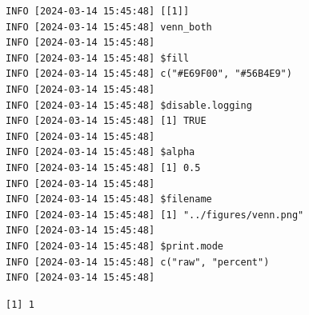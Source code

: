 \documentclass[
  letterpaper,
  DIV=11,
  numbers=noendperiod]{scrartcl}
\begin{document}
\begin{verbatim}
INFO [2024-03-14 15:45:48] [[1]]
INFO [2024-03-14 15:45:48] venn_both
INFO [2024-03-14 15:45:48] 
INFO [2024-03-14 15:45:48] $fill
INFO [2024-03-14 15:45:48] c("#E69F00", "#56B4E9")
INFO [2024-03-14 15:45:48] 
INFO [2024-03-14 15:45:48] $disable.logging
INFO [2024-03-14 15:45:48] [1] TRUE
INFO [2024-03-14 15:45:48] 
INFO [2024-03-14 15:45:48] $alpha
INFO [2024-03-14 15:45:48] [1] 0.5
INFO [2024-03-14 15:45:48] 
INFO [2024-03-14 15:45:48] $filename
INFO [2024-03-14 15:45:48] [1] "../figures/venn.png"
INFO [2024-03-14 15:45:48] 
INFO [2024-03-14 15:45:48] $print.mode
INFO [2024-03-14 15:45:48] c("raw", "percent")
INFO [2024-03-14 15:45:48] 
\end{verbatim}

\begin{verbatim}
[1] 1
\end{verbatim}
\end{document}
